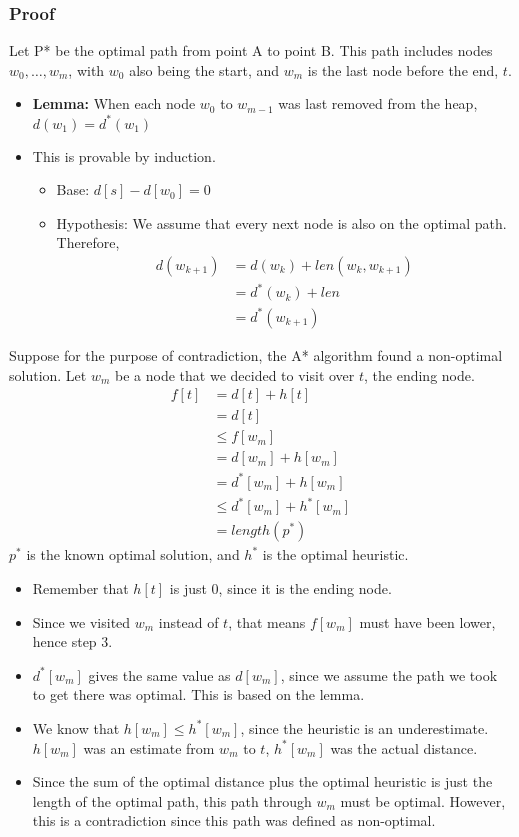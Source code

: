 \documentclass[10pt]{article}
\begin{document}
\subsubsection*{Proof}
Let P* be the optimal path from point A to point B.  This path includes nodes $w_0, \dots, w_m$, with $w_0$ also being the start, and $w_m$ is the last node before the end, $t$.
\begin{itemize}
	\item \textbf{Lemma:} When each node $w_0$ to $w_{m - 1}$ was last removed from the heap, $d(w_1) = d^*(w_1)$
	\item This is provable by induction.
	\begin{itemize}
	    \item Base: $d[s] - d[w_0] = 0$
	    \item Hypothesis: We assume that every next node is also on the optimal path.  Therefore,  
	    \begin{align*}
            d(w_{k + 1}) &= d(w_k) + len(w_k, w_{k + 1})\\
            &= d^*(w_k) + len\\
            &= d^*(w_{k + 1})
        \end{align*}
    \end{itemize}
\end{itemize}
Suppose for the purpose of contradiction, the A* algorithm found a non-optimal solution.  Let $w_m$ be a node that we decided to visit over $t$, the ending node.
\begin{align*}
    f[t] &= d[t] + h[t]\\
    &= d[t]\\
    &\leq f[w_m]\\
    &= d[w_m] + h[w_m]\\
    &= d^*[w_m] + h[w_m]\\
    &\leq d^*[w_m] + h^*[w_m]\\
    &=length(p^*)
\end{align*}
$p^*$ is the known optimal solution, and $h^*$ is the optimal heuristic.
\begin{itemize}
    \item Remember that $h[t]$ is just 0, since it is the ending node.
	\item Since we visited $w_m$ instead of $t$, that means $f[w_m]$ must have been lower, hence step 3.
	\item $d^*[w_m]$ gives the same value as $d[w_m]$, since we assume the path we took to get there was optimal.  This is based on the lemma.
	\item We know that $h[w_m] \leq h^*[w_m]$, since the heuristic is an underestimate.  $h[w_m]$ was an estimate from $w_m$ to $t$, $h^*[w_m]$ was the actual distance.
	\item Since the sum of the optimal distance plus the optimal heuristic is just the length of the optimal path, this path through $w_m$ must be optimal.  However, this is a contradiction since this path was defined as non-optimal.
	
\end{itemize}
\end{document}
